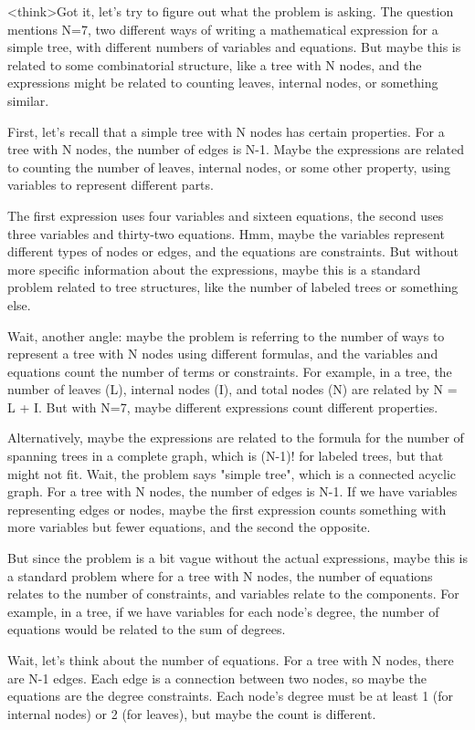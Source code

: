 <think>Got it, let's try to figure out what the problem is asking. The question mentions N=7, two different ways of writing a mathematical expression for a simple tree, with different numbers of variables and equations. But maybe this is related to some combinatorial structure, like a tree with N nodes, and the expressions might be related to counting leaves, internal nodes, or something similar.

First, let's recall that a simple tree with N nodes has certain properties. For a tree with N nodes, the number of edges is N-1. Maybe the expressions are related to counting the number of leaves, internal nodes, or some other property, using variables to represent different parts.

The first expression uses four variables and sixteen equations, the second uses three variables and thirty-two equations. Hmm, maybe the variables represent different types of nodes or edges, and the equations are constraints. But without more specific information about the expressions, maybe this is a standard problem related to tree structures, like the number of labeled trees or something else.

Wait, another angle: maybe the problem is referring to the number of ways to represent a tree with N nodes using different formulas, and the variables and equations count the number of terms or constraints. For example, in a tree, the number of leaves (L), internal nodes (I), and total nodes (N) are related by N = L + I. But with N=7, maybe different expressions count different properties.

Alternatively, maybe the expressions are related to the formula for the number of spanning trees in a complete graph, which is (N-1)! for labeled trees, but that might not fit. Wait, the problem says "simple tree", which is a connected acyclic graph. For a tree with N nodes, the number of edges is N-1. If we have variables representing edges or nodes, maybe the first expression counts something with more variables but fewer equations, and the second the opposite.

But since the problem is a bit vague without the actual expressions, maybe this is a standard problem where for a tree with N nodes, the number of equations relates to the number of constraints, and variables relate to the components. For example, in a tree, if we have variables for each node's degree, the number of equations would be related to the sum of degrees.

Wait, let's think about the number of equations. For a tree with N nodes, there are N-1 edges. Each edge is a connection between two nodes, so maybe the equations are the degree constraints. Each node's degree must be at least 1 (for internal nodes) or 2 (for leaves), but maybe the count is different.

